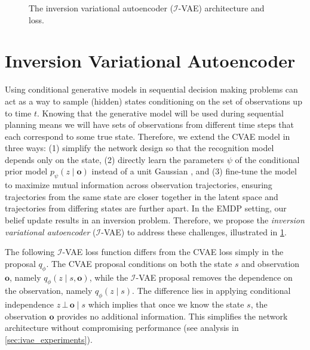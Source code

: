 \begin{figure}[t]
    \centering
    \caption{The inversion variational autoencoder ($\mathcal{I}$-VAE) architecture and loss.}
    \label{fig:ivae}
\end{figure}


\section{Inversion Variational Autoencoder}
Using conditional generative models in sequential decision making problems can act as a way to sample (hidden) states conditioning on the set of observations up to time $t$.
Knowing that the generative model will be used during sequential planning means we will have sets of observations from different time steps that each correspond to some true state.
Therefore, we extend the CVAE model in three ways: (1) simplify the network design so that the recognition model depends only on the state, (2) directly learn the parameters $\psi$ of the conditional prior model $p_\psi(z \mid \mathbf{o})$ instead of a unit Gaussian \cite{sohn2015learning,walker2016uncertain,babaeizadeh2018stochastic}, and (3) fine-tune the model to maximize mutual information \cite{oord2018representation} across observation trajectories, ensuring trajectories from the same state are closer together in the latent space and trajectories from differing states are further apart.
In the EMDP setting, our belief update results in an inversion problem.
Therefore, we propose the \textit{inversion variational autoencoder} ($\mathcal{I}$-VAE) to address these challenges, illustrated in \cref{fig:ivae}.

The following $\mathcal{I}$-VAE loss function differs from the CVAE loss simply in the proposal $q_\phi$.
The CVAE proposal conditions on both the state $s$ and observation $\mathbf{o}$, namely $q_\phi(z \mid s, \mathbf{o})$, while the $\mathcal{I}$-VAE proposal removes the dependence on the observation, namely $q_\phi(z \mid s)$.
The difference lies in applying conditional independence $z \,\bot\, \mathbf{o} \mid s$ which implies that once we know the state $s$, the observation $\mathbf{o}$ provides no additional information.
This simplifies the network architecture without compromising performance (see analysis in \cref{sec:ivae_experiments}).

